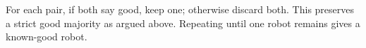 \documentclass[11pt,addpoints,answers]{exam}
\begin{document}
\begin{questions}
\begin{parts}
\begin{solution}
For each pair, if both say good, keep one; otherwise discard both. This preserves a strict good majority as argued above. Repeating until one robot remains gives a known-good robot.
\end{solution}
    
\end{parts}


\end{questions}
\end{document}
